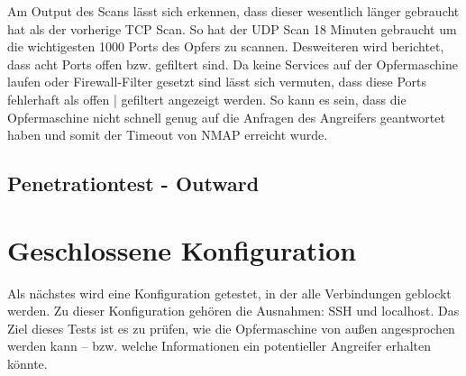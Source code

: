 

Am Output des Scans lässt sich erkennen, dass dieser wesentlich länger gebraucht hat als der vorherige TCP Scan. So hat der UDP Scan 18 Minuten gebraucht um die wichtigesten 1000 Ports des Opfers zu scannen. Desweiteren wird berichtet, dass acht Ports offen bzw. gefiltert sind. Da keine Services auf der Opfermaschine laufen oder Firewall-Filter gesetzt sind lässt sich vermuten, dass diese Ports fehlerhaft als offen | gefiltert angezeigt werden. So kann es sein, dass die Opfermaschine nicht schnell genug auf die Anfragen des Angreifers geantwortet haben und somit der Timeout von NMAP erreicht wurde. 

\subsection{Penetrationtest - Outward}

\section{Geschlossene Konfiguration}
Als nächstes wird eine Konfiguration getestet, in der alle Verbindungen geblockt werden. Zu dieser Konfiguration gehören die Ausnahmen: SSH und localhost. Das Ziel dieses Tests ist es zu prüfen, wie die Opfermaschine von außen angesprochen werden kann – bzw. welche Informationen ein potentieller Angreifer erhalten könnte.
 
